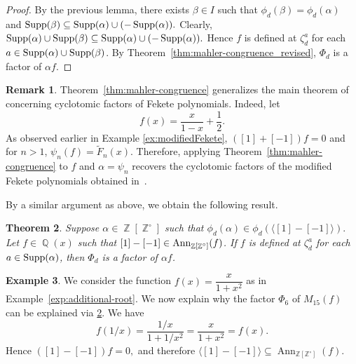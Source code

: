 \documentclass[12t,a4paper]{amsart}
\newtheorem{thm}{Theorem}[section]
\theoremstyle{definition}
\newtheorem{expl}[thm]{Example}
\newtheorem{rem}[thm]{Remark}
\DeclareMathOperator{\Z}{\mathbb{Z}}
\DeclareMathOperator{\Q}{\mathbb{Q}}
\DeclareMathOperator{\supp}{{\rm Supp}}
\newcommand{\Ann}{{\rm Ann}}
\numberwithin{equation}{section}
\begin{document}
{\begin{proof}
    By the previous lemma, there exists $\beta\in I$ such that $\phi_d(\beta)=\phi_d(\alpha)$ and
    \(
    \supp(\beta)\subseteq \supp(\alpha)\cup(-\supp(\alpha)).
    \)
    Clearly, \( \supp(\alpha)\cup\supp(\beta) \subseteq \supp(\alpha)\cup(-\supp(\alpha)).\) Hence $f$ is defined at $\zeta_d^a$ for each $a\in \supp(\alpha)\cup \supp(\beta)$. 
    By Theorem~\ref{thm:mahler-congruence_revised}, $\Phi_d$ is a factor of $\alpha f$. 
\end{proof}

\begin{rem}
Theorem~\ref{thm:mahler-congruence} generalizes the main theorem of~\cite[Theorem~2.19]{chidambaram2023fekete}
concerning cyclotomic factors of Fekete polynomials. Indeed, let
\[
f(x)=\frac{x}{1-x}+\dfrac{1}{2}.
\]
As observed earlier in Example \ref{ex:modifiedFekete},
\(
([1]+[-1])f=0
\)
and for \(n>1\),
\(
\psi_n(f)=\tilde{F}_n(x).
\)
Therefore, applying Theorem~\ref{thm:mahler-congruence}
to \(f\) and $\alpha=\psi_n$ recovers the cyclotomic factors of the modified Fekete
polynomials obtained in~\cite[Theorem~2.19]{chidambaram2023fekete}.
    
\end{rem}
   By a similar argument as above, we obtain the following result.
   
     \begin{thm} \label{thm:mahler-congruence_02}
    Suppose $\alpha \in \Z[\Z^{\circ}]$ such that $\phi_d(\alpha) \in \phi_d(\langle [1] - [-1]\rangle).$ Let $f \in \Q(x)$ such that $[1] - [-1]\in \Ann_{\Z[\Z^{\circ}]}(f)$. If $f$ is defined at $\zeta_d^a$ for each $a \in \supp(\alpha)$, then $\Phi_d$ is a factor of $\alpha f$. 
\end{thm}

\begin{expl} We consider the function $f(x)=\dfrac{x}{1+x^2}$ as in Example~\ref{exp:additional-root}. 
    We now explain why the factor $\Phi_6$ of $M_{15}(f)$ can be explained via  \cref{thm:mahler-congruence_02}.  We have \[ f(1/x) = \frac{1/x}{1+1/x^2} = \frac{x}{1+x^2} = f(x). \] 
    Hence \( ([1]-[-1])f=0, \) and therefore \( \langle [1]-[-1]\rangle \subseteq \operatorname{Ann}_{\mathbb Z[\mathbb Z^\circ]}(f). \)
    

\end{expl}}
\end{document}
